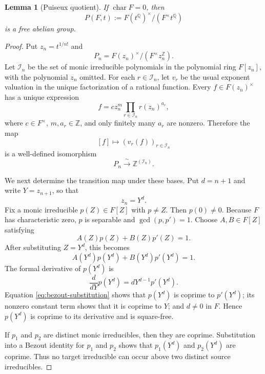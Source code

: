 \documentclass[11pt,a4paper]{article}
\numberwithin{equation}{section}
\theoremstyle{plain}
\newtheorem{lemma}[theorem]{Lemma}
\theoremstyle{definition}
\theoremstyle{remark}
\newcommand{\Q}{\mathbb Q}
\newcommand{\Z}{\mathbb Z}
\begin{document}
\begin{lemma}[Puiseux quotient]\label{lem:puiseux-free}
If $\operatorname{char}F=0$, then
\[
  P(F,t):=F(t^{\Q})^\times/(F^\times t^{\Q})
\]
is a free abelian group.
\end{lemma}

\begin{proof}
Put $z_n=t^{1/n!}$ and
\[
  P_n=F(z_n)^\times/(F^\times z_n^{\Z}).
\]
Let $\mathcal I_n$ be the set of monic irreducible polynomials in the
polynomial ring $F[z_n]$, with the polynomial $z_n$ omitted.  For each
$r\in\mathcal I_n$, let $v_r$ be the usual exponent valuation in the unique
factorization of a rational function.  Every $f\in F(z_n)^\times$ has a
unique expression
\begin{equation}\label{eq:rational-factorization}
  f=c z_n^m\prod_{r\in\mathcal I_n}r(z_n)^{a_r},
\end{equation}
where $c\in F^\times$, $m,a_r\in\Z$, and only finitely many $a_r$ are
nonzero.  Therefore the map
\[
  [f]\longmapsto (v_r(f))_{r\in\mathcal I_n}
\]
is a well-defined isomorphism
\begin{equation}\label{eq:Pn-free}
  P_n\xrightarrow{\ \sim\ }\Z^{(\mathcal I_n)}.
\end{equation}

We next determine the transition map under these bases.  Put $d=n+1$ and
write $Y=z_{n+1}$, so that
\begin{equation}\label{eq:stage-substitution}
  z_n=Y^d.
\end{equation}
Fix a monic irreducible $p(Z)\in F[Z]$ with $p\neq Z$.  Then $p(0)\neq0$.
Because $F$ has characteristic zero, $p$ is separable and
$\gcd(p,p')=1$.  Choose $A,B\in F[Z]$ satisfying
\[
  A(Z)p(Z)+B(Z)p'(Z)=1.
\]
After substituting $Z=Y^d$, this becomes
\begin{equation}\label{eq:bezout-substitution}
  A(Y^d)p(Y^d)+B(Y^d)p'(Y^d)=1.
\end{equation}
The formal derivative of $p(Y^d)$ is
\[
  \frac{d}{dY}p(Y^d)=dY^{d-1}p'(Y^d).
\]
Equation \cref{eq:bezout-substitution} shows that $p(Y^d)$ is coprime to
$p'(Y^d)$; its nonzero constant term shows that it is coprime to $Y$; and
$d\neq0$ in $F$.  Hence $p(Y^d)$ is coprime to its derivative and is
square-free.

If $p_1$ and $p_2$ are distinct monic irreducibles, then they are coprime.
Substitution into a Bezout identity for $p_1$ and $p_2$ shows that
$p_1(Y^d)$ and $p_2(Y^d)$ are coprime.  Thus no target irreducible can
occur above two distinct source irreducibles.


\end{proof}
\end{document}

